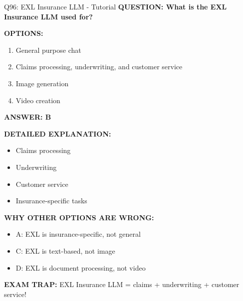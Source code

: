 \documentclass[8pt]{beamer}
\begin{document}
	\begin{frame}{Q96: EXL Insurance LLM - Tutorial}
		\fontsize{6.5}{7.5}\selectfont
		\textbf{QUESTION: What is the EXL Insurance LLM used for?}
		
		\vspace{0.1cm}
		\textbf{OPTIONS:}
		\begin{enumerate}
			\item General purpose chat
			\item Claims processing, underwriting, and customer service
			\item Image generation
			\item Video creation
		\end{enumerate}
		
		\vspace{0.1cm}
		\textcolor{myblue}{\textbf{ANSWER: B}}
		
		\vspace{0.1cm}
		\textbf{DETAILED EXPLANATION:}
		\begin{itemize}
			\item Claims processing
			\item Underwriting
			\item Customer service
			\item Insurance-specific tasks
		\end{itemize}
		
		\vspace{0.1cm}
		\textcolor{myred}{\textbf{WHY OTHER OPTIONS ARE WRONG:}}
		\begin{itemize}
			\item \textcolor{myred}{A:} EXL is insurance-specific, not general
			\item \textcolor{myred}{C:} EXL is text-based, not image
			\item \textcolor{myred}{D:} EXL is document processing, not video
		\end{itemize}
		
		\textcolor{myred}{\textbf{EXAM TRAP:}} EXL Insurance LLM = \textcolor{myblue}{claims + underwriting + customer service}!
	\end{frame}
	
\end{document}

